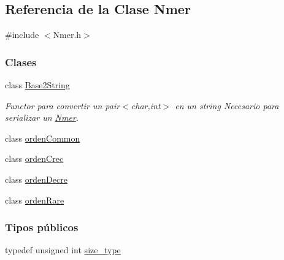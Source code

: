 \hypertarget{classNmer}{}\subsection{Referencia de la Clase Nmer}
\label{classNmer}


{\ttfamily \#include $<$Nmer.\+h$>$}

\subsubsection*{Clases}
\begin{DoxyCompactItemize}
\item 
class \hyperlink{classNmer_1_1Base2String}{Base2\+String}
\begin{DoxyCompactList}\small\item\em Functor para convertir un pair$<$char,int$>$ en un string Necesario para serializar un \hyperlink{classNmer}{Nmer}. \end{DoxyCompactList}\item 
class \hyperlink{classNmer_1_1ordenCommon}{orden\+Common}
\item 
class \hyperlink{classNmer_1_1ordenCrec}{orden\+Crec}
\item 
class \hyperlink{classNmer_1_1ordenDecre}{orden\+Decre}
\item 
class \hyperlink{classNmer_1_1ordenRare}{orden\+Rare}
\end{DoxyCompactItemize}
\subsubsection*{Tipos públicos}
\begin{DoxyCompactItemize}
\item 
typedef unsigned int \hyperlink{classNmer_a1b8892df885de3ac91edf3abd8f1b55d}{size\+\_\+type}
\end{DoxyCompactItemize}
